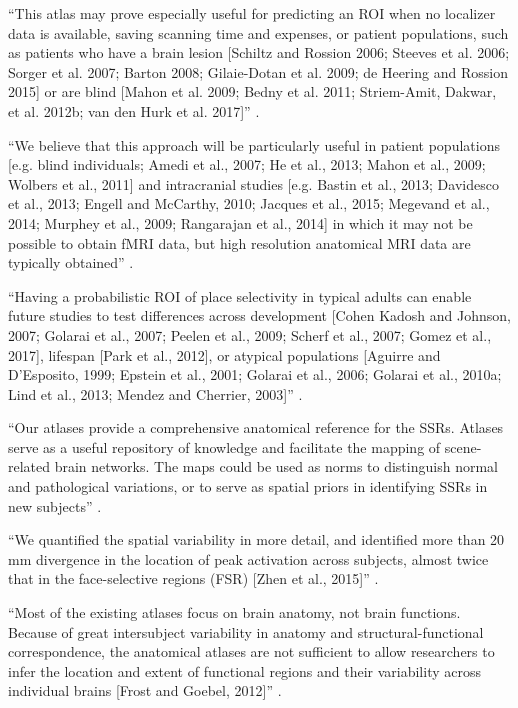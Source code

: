``This atlas may prove especially useful for predicting an ROI when no localizer
data is available, saving scanning time and expenses, or
%
patient populations, such as patients who have a brain lesion [Schiltz and
Rossion 2006; Steeves et al. 2006; Sorger et al. 2007; Barton 2008; Gilaie-Dotan
et al. 2009; de Heering and Rossion 2015] or are blind [Mahon et al. 2009; Bedny
et al. 2011; Striem-Amit, Dakwar, et al.  2012b; van den Hurk et al. 2017]''
\citep{rosenke2021probabilistic}.



``We believe that this approach will be particularly useful in patient
populations [e.g. blind individuals; Amedi et al., 2007; He et al., 2013; Mahon
et al., 2009; Wolbers et al., 2011] and intracranial studies [e.g. Bastin et
al., 2013; Davidesco et al., 2013; Engell and McCarthy, 2010; Jacques et al.,
2015; Megevand et al., 2014; Murphey et al., 2009; Rangarajan et al., 2014] in
which it may not be possible to obtain fMRI data, but high resolution anatomical
MRI data are typically obtained'' \citep{weiner2018defining}.

``Having a probabilistic ROI of place selectivity in typical adults can enable
future studies to test differences across development [Cohen Kadosh and Johnson,
2007; Golarai et al., 2007; Peelen et al., 2009; Scherf et al., 2007; Gomez et
al., 2017], lifespan [Park et al., 2012], or atypical populations [Aguirre and
D'Esposito, 1999; Epstein et al., 2001; Golarai et al., 2006; Golarai et al.,
2010a; Lind et al., 2013; Mendez and Cherrier, 2003]''
\citep{weiner2018defining}.


``Our atlases provide a comprehensive anatomical reference for the SSRs.
%
Atlases serve as a useful repository of knowledge and facilitate the mapping of
scene-related brain networks.
%
The maps could be used as norms to distinguish normal and pathological
variations, or to serve as spatial priors in identifying SSRs in new subjects''
\citep{zhen2017quantifying}.

``We quantified the spatial variability in more detail, and identified more than
20 mm divergence in the location of peak activation across subjects, almost
twice that in the face-selective regions (FSR) [Zhen et al., 2015]''
\citep{zhen2017quantifying}.






``Most of the existing atlases focus on brain anatomy, not brain functions.
%
Because of great intersubject variability in anatomy and structural-functional
correspondence, the anatomical atlases are not sufficient to allow researchers
to infer the location and extent of functional regions and their variability
across individual brains [Frost and Goebel, 2012]'' \citep{zhen2015quantifying}.

